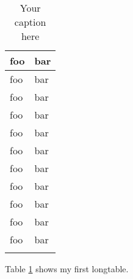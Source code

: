 \documentclass{article}
\begin{document}
\lipsum[1]
\lipsum[1]
\lipsum[1]

\centering
\begin{longtable}{| p{} | p{} |} 
\hline
foo & bar \\ \hline 
foo & bar \\ \hline
foo & bar \\ \hline
foo & bar \\ \hline
foo & bar \\ \hline
foo & bar \\ \hline
foo & bar \\ \hline
foo & bar \\ \hline
foo & bar \\ \hline
foo & bar \\ \hline
foo & bar \\ \hline
\caption{Your caption here} %
\label{tab:myfirstlongtable}
\end{longtable}

Table \ref{tab:myfirstlongtable} shows my first longtable.
\end{document}

